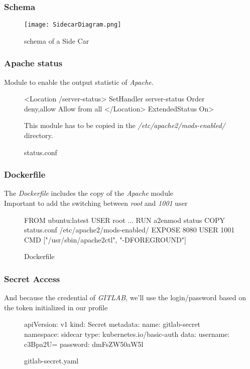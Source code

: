 
\begin{frame}[fragile]
  \frametitle{Schema}
\begin{figure}[ht]
  \caption{schema of a Side Car}
  \centering
  \texttt{[image: SidecarDiagram.png]}
  \label{fig:SidecarDiagram}
\end{figure}
\end{frame}

\begin{frame}[fragile]
  \frametitle{Apache status}
  Module to enable the output statistic of \emph{Apache}.

  \begin{figure}
    \begin{apachecode}
      <Location /server-status>
        SetHandler server-status
        Order deny,allow
        Allow from all
      </Location> ExtendedStatus On>
    \end{apachecode}
    \caption{status.conf}

    This module has to be copied in the \emph{/etc/apache2/mods-enabled/} directory.
  \end{figure}
\end{frame}

\begin{frame}[fragile]
  \frametitle{Dockerfile}
  The \emph{Dockerfile} includes the copy of the \emph{Apache} module\\
  Important to add the switching between \textit{root} and \textit{1001} user
  \begin{figure}
    \begin{dockercode}
      FROM ubuntu:latest
      USER root
      ...
      RUN a2enmod status
      COPY status.conf /etc/apache2/mods-enabled/
      EXPOSE 8080
      USER 1001
      CMD ["/usr/sbin/apache2ctl", "-DFOREGROUND"]
    \end{dockercode}
    \caption{Dockerfile}
  \end{figure}

\end{frame}

\begin{frame}[fragile]
  \frametitle{Secret Access}
  And because the credential of \emph{GITLAB}, we'll use the login/password based on the token initialized in our profile
  \begin{figure}
    \begin{yamlcode}
      apiVersion: v1
      kind: Secret
      metadata:
        name: gitlab-secret
        namespace: sidecar
      type: kubernetes.io/basic-auth
      data:
        username: c3Bpa2U=
        password: dmFsZW50aW5l
    \end{yamlcode}
    \caption{gitlab-secret.yaml}
  \end{figure}
\end{frame}

